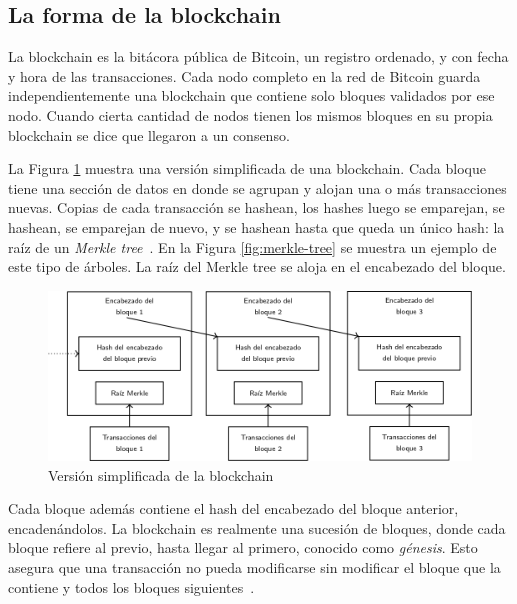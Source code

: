 \subsection{La forma de la blockchain}

La blockchain es la bitácora pública de Bitcoin, un registro ordenado, y con fecha y hora de las transacciones.
%
Cada nodo completo en la red de Bitcoin guarda independientemente una blockchain que contiene solo
bloques validados por ese nodo.
%
Cuando cierta cantidad de nodos tienen los mismos bloques en su propia blockchain
se dice que llegaron a un consenso. 

La Figura \ref{fig:blockchain} muestra una versión simplificada de una blockchain.
Cada bloque tiene una sección de datos en donde
se agrupan y alojan una o más transacciones nuevas. Copias de cada transacción se hashean, los hashes luego
se emparejan, se hashean, se emparejan de nuevo, y se hashean hasta que queda un único hash: la raíz de un
\textit{Merkle tree}~\cite{merkle.tree}. 
En la Figura \ref{fig:merkle-tree} se muestra un ejemplo de este tipo de árboles.
La raíz del Merkle tree se aloja en el encabezado del bloque.

\begin{figure}[h]
  \centering
  \includegraphics[scale=0.4]{figures/blockchain.png}
  \caption{Versión simplificada de la blockchain}
  \label{fig:blockchain}
\end{figure}

%
Cada bloque además contiene el hash del encabezado del bloque anterior, encadenándolos.
La blockchain es realmente una sucesión de bloques, donde cada bloque refiere al previo,
hasta llegar al primero, conocido como \textit{génesis}.
Esto asegura que una transacción no pueda modificarse sin modificar el bloque
que la contiene y todos los bloques siguientes~\cite{bitcoin}.

